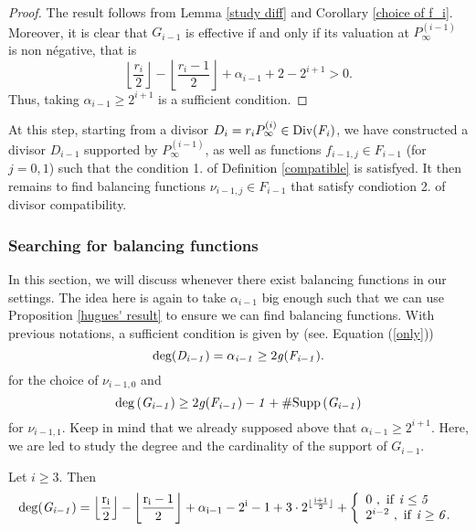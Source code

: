 \documentclass[10pt]{article}
\begin{document}
\s

\begin{proof}
The result follows from Lemma \ref{study diff} and Corollary \ref{choice of f_i}. Moreover, it is clear that $G_{i-1}$ is effective if and only if its valuation at $P_{\infty}^{(i-1)}$ is non négative, that is
\[\left \lfloor \frac{r_i}{2}\right\rfloor - \left \lfloor \frac{r_i-1}{2}\right\rfloor + \alpha_{i-1} +2-2^{i+1} > 0.\]
Thus, taking $\alpha_{i-1} \geq 2^{i+1}$ is a sufficient condition.
\end{proof}

\s

At this step, starting from a divisor $D_i = r_iP_{\infty}^{(i)} \in \rm Div \it (F_i)$, we have constructed a divisor $D_{i-1}$ supported by $P_{\infty}^{(i-1)}$, as well as functions $f_{i-1,j} \in F_{i-1}$ (for $j=0,1$) such that the condition 1. of Definition \ref{compatible} is satisfyed. It then remains to find balancing functions $\nu_{i-1,j} \in F_{i-1}$ that satisfy condiotion 2. of divisor compatibility.

\s

\subsubsection{Searching for balancing functions}

\s

In this section, we will discuss whenever there exist balancing functions in our settings. The idea here is again to take $\alpha_{i-1}$ big enough such that we can use Proposition \ref{hugues' result} to ensure we can find balancing functions. With previous notations, a sufficient condition is given by (see. Equation (\ref{only}))
\begin{equation} \label{9}
\rm deg \it (D_{i-1}) = \alpha_{i-1} \geq \rm 2 \it g \it (F_{i-1}). 
\end{equation}
for the choice of $\nu_{i-1,0}$ and 
\begin{equation} \label{condition pour balancer}
\rm deg \it \left(G_{i-1}\right) \geq \rm 2 \it g(F_{i-1}) -1 + \#\rm Supp \it \left( G_{i-1} \right)
\end{equation}
for $\nu_{i-1,1}$.
Keep in mind that we already supposed above that $\alpha_{i-1} \geq 2^{i+1}$. Here, we are led to study the degree and the cardinality of the support of $G_{i-1}$.

\s

\begin{lemma} \label{deg Gi}
Let $i \geq 3$. Then 
\begin{equation*}
\rm{deg} (\it G_{i-1}) =  \rm \left \lfloor \frac{r_i}{2}\right\rfloor - \left \lfloor \frac{r_i-1}{2}\right\rfloor + \alpha_{i-1}-2^{i} -1 + 3 \cdot 2^{\lfloor \frac{i+1}{2} \rfloor} + \left\{ \begin{array}{ll}
 0 \ , \ \rm{if} \ \it i \leq 5 \\
 2^{i-2} \ , \ \rm{if} \ \it i \geq 6.
\end{array}
\right.
\end{equation*}
\end{lemma}
\end{document}
